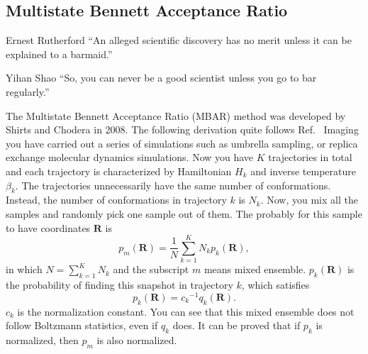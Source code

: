 \subsection{Multistate Bennett Acceptance Ratio\label{Sec:FEM:MBAR}}
\begin{chapquote}{Ernest Rutherford%
	}
	``An alleged scientific discovery has no merit unless it can be explained to a barmaid.''
\end{chapquote}
\begin{chapquote}{Yihan Shao}
	``So, you can never be a good scientist unless you go to bar regularly.''
\end{chapquote}
The Multistate Bennett Acceptance Ratio (MBAR) method was developed by Shirts and Chodera in 2008.\cite{ShirtsJCP2008} The following derivation quite follows Ref.~\cite{ShirtsarXiv2017}
Imaging you have carried out a series of simulations such as umbrella sampling, or replica exchange molecular dynamics simulations.
Now you have $K$ trajectories in total and each trajectory is characterized by Hamiltonian $H_k$ and inverse temperature $\beta_k$. The trajectories unnecessarily have the same number of conformations. Instead, the number of conformations in trajectory $k$ is $N_k$. Now, you mix all the samples and randomly pick one sample out of them. The probably for this sample to have coordinates $\mathbf{R}$ is 
\begin{equation}
p_m(\mathbf{R})=\frac 1N\sum_{k=1}^{K}N_kp_k(\mathbf{R}),
\end{equation}
in which $N=\sum\limits_{k=1}^{K}N_k$ and the subscript $m$ means mixed ensemble. $p_k(\mathbf{R})$ is the probability of finding this snapshot in trajectory $k$, which satisfies
\begin{equation}
p_k(\mathbf{R})={c_k}^{-1}q_k(\mathbf{R}).
\end{equation}
$c_k$ is the normalization constant. You can see that this mixed ensemble does not follow Boltzmann statistics, even if $q_k$ does. It can be proved that if $p_k$ is normalized, then $p_m$ is also normalized.

